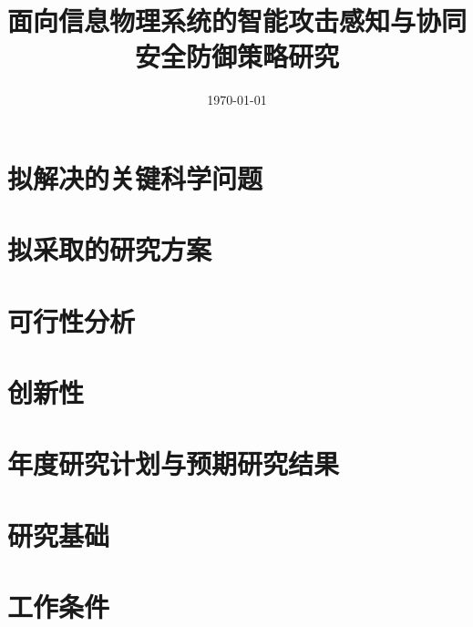 \documentclass[UTF8,a4paper,twoside,12pt]{article}
\begin{document}
\title{面向信息物理系统的智能攻击感知与协同安全防御策略研究}
\author{}
\date{\today}

\maketitle

\newpage

\tableofcontents

\newpage


% 


% 
% 
% 
\section{拟解决的关键科学问题}
\section{拟采取的研究方案}
\section{可行性分析}
\section{创新性}
\section{年度研究计划与预期研究结果}
\section{研究基础}
\section{工作条件}
\end{document}
